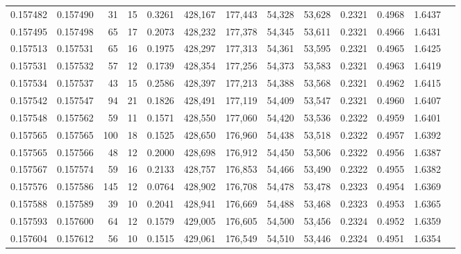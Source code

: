 \begin{tabular}{rrrrrrrrrrrrr}
0.157482 & 0.157490 &    31 &  15 &                                     0.3261 & 428,167 & 177,443 &  54,328 &  53,628 & 0.2321 & 0.4968 & 1.6437 \\
0.157495 & 0.157498 &    65 &  17 &                                     0.2073 & 428,232 & 177,378 &  54,345 &  53,611 & 0.2321 & 0.4966 & 1.6431 \\
0.157513 & 0.157531 &    65 &  16 &                                     0.1975 & 428,297 & 177,313 &  54,361 &  53,595 & 0.2321 & 0.4965 & 1.6425 \\
0.157531 & 0.157532 &    57 &  12 &                                     0.1739 & 428,354 & 177,256 &  54,373 &  53,583 & 0.2321 & 0.4963 & 1.6419 \\
0.157534 & 0.157537 &    43 &  15 &                                     0.2586 & 428,397 & 177,213 &  54,388 &  53,568 & 0.2321 & 0.4962 & 1.6415 \\
0.157542 & 0.157547 &    94 &  21 &                                     0.1826 & 428,491 & 177,119 &  54,409 &  53,547 & 0.2321 & 0.4960 & 1.6407 \\
0.157548 & 0.157562 &    59 &  11 &                                     0.1571 & 428,550 & 177,060 &  54,420 &  53,536 & 0.2322 & 0.4959 & 1.6401 \\
0.157565 & 0.157565 &   100 &  18 &                                     0.1525 & 428,650 & 176,960 &  54,438 &  53,518 & 0.2322 & 0.4957 & 1.6392 \\
0.157565 & 0.157566 &    48 &  12 &                                     0.2000 & 428,698 & 176,912 &  54,450 &  53,506 & 0.2322 & 0.4956 & 1.6387 \\
0.157567 & 0.157574 &    59 &  16 &                                     0.2133 & 428,757 & 176,853 &  54,466 &  53,490 & 0.2322 & 0.4955 & 1.6382 \\
0.157576 & 0.157586 &   145 &  12 &                                     0.0764 & 428,902 & 176,708 &  54,478 &  53,478 & 0.2323 & 0.4954 & 1.6369 \\
0.157588 & 0.157589 &    39 &  10 &                                     0.2041 & 428,941 & 176,669 &  54,488 &  53,468 & 0.2323 & 0.4953 & 1.6365 \\
0.157593 & 0.157600 &    64 &  12 &                                     0.1579 & 429,005 & 176,605 &  54,500 &  53,456 & 0.2324 & 0.4952 & 1.6359 \\
0.157604 & 0.157612 &    56 &  10 &                                     0.1515 & 429,061 & 176,549 &  54,510 &  53,446 & 0.2324 & 0.4951 & 1.6354 \\

\end{tabular}
